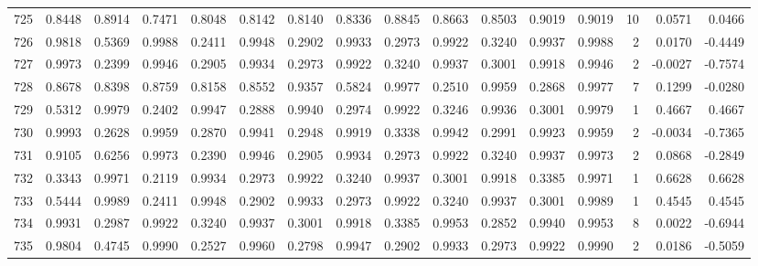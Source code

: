 \begin{tabular}{lrrrrrrrrrrrrrrr}
725 &      0.8448 &  0.8914 &  0.7471 &  0.8048 &  0.8142 &  0.8140 &  0.8336 &  0.8845 &  0.8663 &  0.8503 &   0.9019 &     0.9019 &     10 &                    0.0571 &                     0.0466 \\
726 &      0.9818 &  0.5369 &  0.9988 &  0.2411 &  0.9948 &  0.2902 &  0.9933 &  0.2973 &  0.9922 &  0.3240 &   0.9937 &     0.9988 &      2 &                    0.0170 &                    -0.4449 \\
727 &      0.9973 &  0.2399 &  0.9946 &  0.2905 &  0.9934 &  0.2973 &  0.9922 &  0.3240 &  0.9937 &  0.3001 &   0.9918 &     0.9946 &      2 &                   -0.0027 &                    -0.7574 \\
728 &      0.8678 &  0.8398 &  0.8759 &  0.8158 &  0.8552 &  0.9357 &  0.5824 &  0.9977 &  0.2510 &  0.9959 &   0.2868 &     0.9977 &      7 &                    0.1299 &                    -0.0280 \\
729 &      0.5312 &  0.9979 &  0.2402 &  0.9947 &  0.2888 &  0.9940 &  0.2974 &  0.9922 &  0.3246 &  0.9936 &   0.3001 &     0.9979 &      1 &                    0.4667 &                     0.4667 \\
730 &      0.9993 &  0.2628 &  0.9959 &  0.2870 &  0.9941 &  0.2948 &  0.9919 &  0.3338 &  0.9942 &  0.2991 &   0.9923 &     0.9959 &      2 &                   -0.0034 &                    -0.7365 \\
731 &      0.9105 &  0.6256 &  0.9973 &  0.2390 &  0.9946 &  0.2905 &  0.9934 &  0.2973 &  0.9922 &  0.3240 &   0.9937 &     0.9973 &      2 &                    0.0868 &                    -0.2849 \\
732 &      0.3343 &  0.9971 &  0.2119 &  0.9934 &  0.2973 &  0.9922 &  0.3240 &  0.9937 &  0.3001 &  0.9918 &   0.3385 &     0.9971 &      1 &                    0.6628 &                     0.6628 \\
733 &      0.5444 &  0.9989 &  0.2411 &  0.9948 &  0.2902 &  0.9933 &  0.2973 &  0.9922 &  0.3240 &  0.9937 &   0.3001 &     0.9989 &      1 &                    0.4545 &                     0.4545 \\
734 &      0.9931 &  0.2987 &  0.9922 &  0.3240 &  0.9937 &  0.3001 &  0.9918 &  0.3385 &  0.9953 &  0.2852 &   0.9940 &     0.9953 &      8 &                    0.0022 &                    -0.6944 \\
735 &      0.9804 &  0.4745 &  0.9990 &  0.2527 &  0.9960 &  0.2798 &  0.9947 &  0.2902 &  0.9933 &  0.2973 &   0.9922 &     0.9990 &      2 &                    0.0186 &                    -0.5059 \\

\end{tabular}
